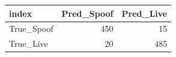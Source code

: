 \begin{tabular}{lrr}
\toprule
index & Pred_Spoof & Pred_Live \\
\midrule
True_Spoof & 450 & 15 \\
True_Live & 20 & 485 \\
\bottomrule
\end{tabular}
